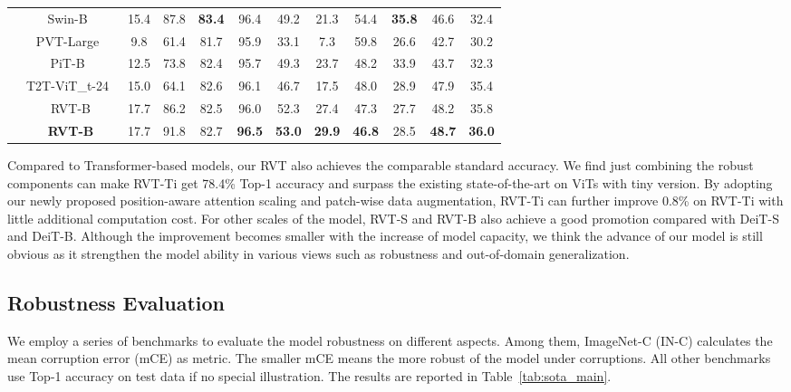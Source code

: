 \documentclass[10pt,twocolumn,letterpaper]{article}
\begin{document}
\begin{table*}
{\begin{tabular}{c|c|cc|cc|cccccc}
& Swin-B~\cite{liu2021swin} & 15.4 & 87.8 & \textbf{83.4} & 96.4 & 49.2 & 21.3 & 54.4 & \textbf{35.8} & 46.6 & 32.4 \\
        & PVT-Large~\cite{wang2021pyramid} & 9.8 & 61.4 & 81.7 & 95.9 & 33.1 & 7.3 & 59.8 & 26.6 & 42.7 & 30.2\\
        & PiT-B~\cite{heo2021rethinking} & 12.5 & 73.8 & 82.4 & 95.7 & 49.3 & 23.7 & 48.2 & 33.9 & 43.7 & 32.3 \\
        & T2T-ViT\_t-24~\cite{yuan2021tokens} & 15.0 & 64.1 & 82.6 & 96.1 & 46.7 & 17.5 & 48.0 & 28.9 & 47.9 & 35.4 \\
        & RVT-B & 17.7 & 86.2 & 82.5 & 96.0 & 52.3 & 27.4 & 47.3  & 27.7 & 48.2 & 35.8 \\
        & \textbf{RVT-B} & 17.7 & 91.8 & 82.7 & \textbf{96.5} & \textbf{53.0} & \textbf{29.9} & \textbf{46.8} & 28.5 & \textbf{48.7} & \textbf{36.0}    \\

        \bottomrule
    \end{tabular}
    }
    \vspace{-6mm}
    \label{tab:sota_main}
\end{table*}

Compared to Transformer-based models, our RVT also achieves the comparable standard accuracy. We find just combining the robust components can make RVT-Ti get 78.4\% Top-1 accuracy and surpass the existing state-of-the-art on ViTs with tiny version. By adopting our newly proposed position-aware attention scaling and patch-wise data augmentation, RVT-Ti can further 
improve 0.8\% on RVT-Ti with little additional computation cost. For other scales of the model, RVT-S and RVT-B also achieve a good promotion compared with DeiT-S and DeiT-B. Although the improvement becomes smaller with the increase of model capacity, we think the advance of our model is still obvious as it strengthen the model ability in various views such as robustness and out-of-domain generalization.

\subsection{Robustness Evaluation}
\label{sec:5.3}
We employ a series of benchmarks to evaluate the model robustness on different aspects. Among them, ImageNet-C (IN-C) calculates the mean corruption error (mCE) as metric. The smaller mCE means the more robust of the model under corruptions. All other benchmarks use Top-1 accuracy on test data if no special illustration. The results are reported in Table~\ref{tab:sota_main}.
\end{document}

